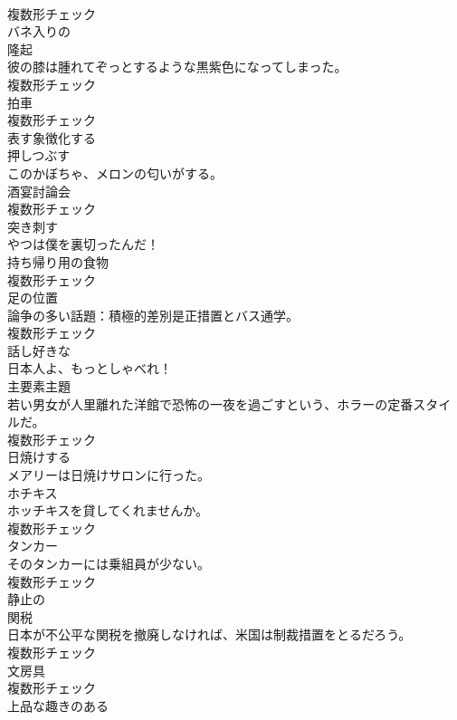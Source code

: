 \documentclass[8pt]{extreport}
\begin{document}
\begin{CJK}{UTF8}{min}
\\	複数形チェック
\\	[形容詞]	バネ入りの	
\\	[名詞]	隆起	
\\	彼の膝は腫れてぞっとするような黒紫色になってしまった。	
\\	複数形チェック
\\	[名詞]	拍車	
\\	複数形チェック
\\	[動詞]	表す象徴化する	
\\	[動詞]	押しつぶす	
\\	このかぼちゃ、メロンの匂いがする。	
\\	[名詞]	酒宴討論会	
\\	複数形チェック
\\	[動詞]	突き刺す	
\\	やつは僕を裏切ったんだ！	
\\	[名詞]	持ち帰り用の食物	
\\	複数形チェック
\\	[名詞]	足の位置	
\\	論争の多い話題：積極的差別是正措置とバス通学。	
\\	複数形チェック
\\	[形容詞]	話し好きな	
\\	日本人よ、もっとしゃべれ！	
\\	[名詞]	主要素主題	
\\	若い男女が人里離れた洋館で恐怖の一夜を過ごすという、ホラーの定番スタイルだ。	
\\	複数形チェック
\\	[動詞]	日焼けする	
\\	メアリーは日焼けサロンに行った。	
\\	[名詞]	ホチキス	
\\	ホッチキスを貸してくれませんか。	
\\	複数形チェック
\\	[名詞]	タンカー	
\\	そのタンカーには乗組員が少ない。	
\\	複数形チェック
\\	[形容詞]	静止の	
\\	[名詞]	関税	
\\	日本が不公平な関税を撤廃しなければ、米国は制裁措置をとるだろう。	
\\	複数形チェック
\\	[名詞]	文房具	
\\	複数形チェック
\\	[形容詞]	上品な趣きのある	

\end{CJK}
\end{document}
